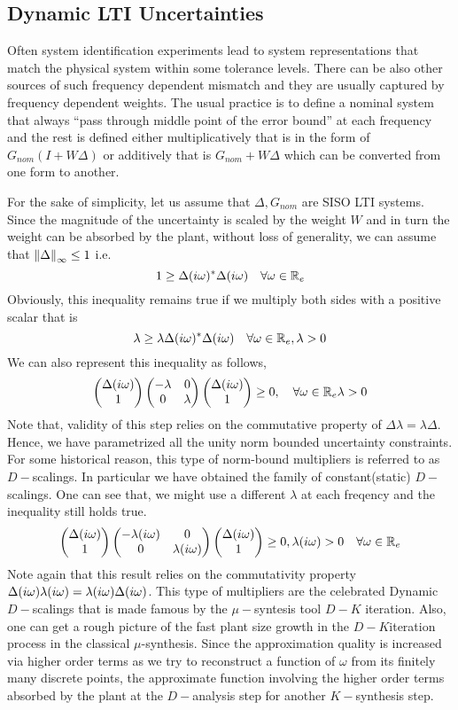 \subsection{Dynamic LTI Uncertainties}
Often system identification experiments lead to system representations that match the physical 
system within some tolerance levels. There can be also other sources of such frequency dependent 
mismatch and they are usually captured by frequency dependent weights. The usual practice 
is to define a nominal system that always ``pass through middle point of the error bound'' at 
each frequency and the rest is defined either multiplicatively that is in the form of $G_{nom}
(I+W\Delta)$ or additively that is $G_{nom} + W\Delta$ which can be converted from one form to 
another. 

For the sake of simplicity, let us assume that $\Delta, G_{nom}$ are SISO LTI systems. Since the 
magnitude of the uncertainty is scaled by the weight $W$ and in turn the weight can be absorbed
by the plant, without loss of generality, we can assume 
that $\displaystyle \left\| \Delta \right\|_\infty\leq 1$ i.e. 
\[
1 \geq \Delta(i\omega)^*\Delta(i\omega) \quad \forall \omega\in\mathbb{R}_e
\]
Obviously, this inequality remains true if we multiply both sides with a positive scalar that is
\[
\lambda \geq \lambda\Delta(i\omega)^*\Delta(i\omega) \quad \forall \omega\in\mathbb{R}_e ,\lambda>0
\]
We can also represent this inequality as follows,
\[
\begin{pmatrix}\Delta(i\omega) \\ 1\end{pmatrix}\begin{pmatrix}-\lambda &0\\0 &\lambda\end{pmatrix}\begin{pmatrix}\Delta(i\omega) \\ 1\end{pmatrix}\geq 0, \quad 
\forall \omega\in\mathbb{R}_e \lambda>0
\]
Note that, validity of this step relies on the commutative property of 
$\Delta \lambda = \lambda\Delta$. Hence, we have parametrized all the unity
norm bounded uncertainty constraints. For some historical reason, this type 
of norm-bound multipliers is referred to as $D-$scalings. In particular we have obtained 
the family of constant(static) $D-$scalings. 
One can see that, we might use a different $\lambda$ at each freqency and the inequality 
still holds true. 
\[
\begin{pmatrix}\Delta(i\omega) \\ 1\end{pmatrix}\begin{pmatrix}-\lambda(i\omega) &0\\0 &\lambda(i\omega)\end{pmatrix}\begin{pmatrix}\Delta(i\omega) \\ 1\end{pmatrix}\geq 0, \lambda(i\omega)>0
\quad \forall \omega\in\mathbb{R}_e 
\]
Note again that this result relies on the commutativity property $\Delta(i\omega)\lambda(i\omega) 
= \lambda(i\omega)\Delta(i\omega)$. This type of multipliers are the celebrated Dynamic $D-$scalings 
that is made famous by the $\mu-$syntesis tool $D-K$ iteration. Also, one can get a rough 
picture of the fast plant size growth in the $D-K$iteration process in the classical 
$\mu$-synthesis. Since the approximation quality is increased via higher order terms as we try
to reconstruct a function of $\omega$ from its finitely many discrete points, 
the approximate function involving the higher order terms absorbed by the plant at the $D-$analysis 
step for another $K-$synthesis step.



